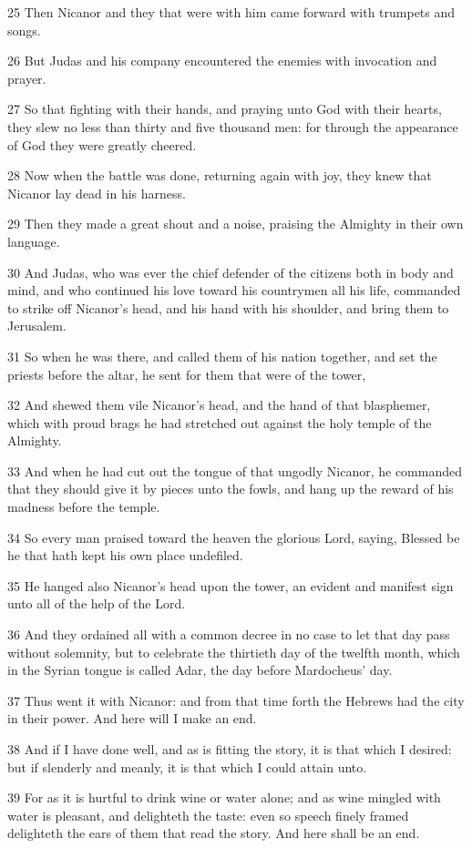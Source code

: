 \par 25 Then Nicanor and they that were with him came forward with trumpets and songs.
\par 26 But Judas and his company encountered the enemies with invocation and prayer.
\par 27 So that fighting with their hands, and praying unto God with their hearts, they slew no less than thirty and five thousand men: for through the appearance of God they were greatly cheered.
\par 28 Now when the battle was done, returning again with joy, they knew that Nicanor lay dead in his harness.
\par 29 Then they made a great shout and a noise, praising the Almighty in their own language.
\par 30 And Judas, who was ever the chief defender of the citizens both in body and mind, and who continued his love toward his countrymen all his life, commanded to strike off Nicanor's head, and his hand with his shoulder, and bring them to Jerusalem.
\par 31 So when he was there, and called them of his nation together, and set the priests before the altar, he sent for them that were of the tower,
\par 32 And shewed them vile Nicanor's head, and the hand of that blasphemer, which with proud brags he had stretched out against the holy temple of the Almighty.
\par 33 And when he had cut out the tongue of that ungodly Nicanor, he commanded that they should give it by pieces unto the fowls, and hang up the reward of his madness before the temple.
\par 34 So every man praised toward the heaven the glorious Lord, saying, Blessed be he that hath kept his own place undefiled.
\par 35 He hanged also Nicanor's head upon the tower, an evident and manifest sign unto all of the help of the Lord.
\par 36 And they ordained all with a common decree in no case to let that day pass without solemnity, but to celebrate the thirtieth day of the twelfth month, which in the Syrian tongue is called Adar, the day before Mardocheus' day.
\par 37 Thus went it with Nicanor: and from that time forth the Hebrews had the city in their power. And here will I make an end.
\par 38 And if I have done well, and as is fitting the story, it is that which I desired: but if slenderly and meanly, it is that which I could attain unto.
\par 39 For as it is hurtful to drink wine or water alone; and as wine mingled with water is pleasant, and delighteth the taste: even so speech finely framed delighteth the ears of them that read the story. And here shall be an end.

